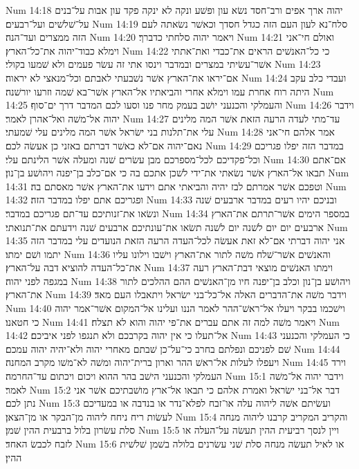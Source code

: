 Num 14:18  יהוה ארך אפים ורב־חסד נשׂא עון ופשׁע ונקה לא ינקה פקד עון אבות על־בנים על־שׁלשׁים ועל־רבעים׃
Num 14:19  סלח־נא לעון העם הזה כגדל חסדך וכאשׁר נשׂאתה לעם הזה ממצרים ועד־הנה׃
Num 14:20  ויאמר יהוה סלחתי כדברך׃
Num 14:21  ואולם חי־אני וימלא כבוד־יהוה את־כל־הארץ׃
Num 14:22  כי כל־האנשׁים הראים את־כבדי ואת־אתתי אשׁר־עשׂיתי במצרים ובמדבר וינסו אתי זה עשׂר פעמים ולא שׁמעו בקולי׃
Num 14:23  אם־יראו את־הארץ אשׁר נשׁבעתי לאבתם וכל־מנאצי לא יראוה׃
Num 14:24  ועבדי כלב עקב היתה רוח אחרת עמו וימלא אחרי והביאתיו אל־הארץ אשׁר־בא שׁמה וזרעו יורשׁנה׃
Num 14:25  והעמלקי והכנעני יושׁב בעמק מחר פנו וסעו לכם המדבר דרך ים־סוף׃
Num 14:26  וידבר יהוה אל־משׁה ואל־אהרן לאמר׃
Num 14:27  עד־מתי לעדה הרעה הזאת אשׁר המה מלינים עלי את־תלנות בני ישׂראל אשׁר המה מלינים עלי שׁמעתי׃
Num 14:28  אמר אלהם חי־אני נאם־יהוה אם־לא כאשׁר דברתם באזני כן אעשׂה לכם׃
Num 14:29  במדבר הזה יפלו פגריכם וכל־פקדיכם לכל־מספרכם מבן עשׂרים שׁנה ומעלה אשׁר הלינתם עלי׃
Num 14:30  אם־אתם תבאו אל־הארץ אשׁר נשׂאתי את־ידי לשׁכן אתכם בה כי אם־כלב בן־יפנה ויהושׁע בן־נון׃
Num 14:31  וטפכם אשׁר אמרתם לבז יהיה והביאתי אתם וידעו את־הארץ אשׁר מאסתם בה׃
Num 14:32  ופגריכם אתם יפלו במדבר הזה׃
Num 14:33  ובניכם יהיו רעים במדבר ארבעים שׁנה ונשׂאו את־זנותיכם עד־תם פגריכם במדבר׃
Num 14:34  במספר הימים אשׁר־תרתם את־הארץ ארבעים יום יום לשׁנה יום לשׁנה תשׂאו את־עונתיכם ארבעים שׁנה וידעתם את־תנואתי׃
Num 14:35  אני יהוה דברתי אם־לא זאת אעשׂה לכל־העדה הרעה הזאת הנועדים עלי במדבר הזה יתמו ושׁם ימתו׃
Num 14:36  והאנשׁים אשׁר־שׁלח משׁה לתור את־הארץ וישׁבו וילונו עליו את־כל־העדה להוציא דבה על־הארץ׃
Num 14:37  וימתו האנשׁים מוצאי דבת־הארץ רעה במגפה לפני יהוה׃
Num 14:38  ויהושׁע בן־נון וכלב בן־יפנה חיו מן־האנשׁים ההם ההלכים לתור את־הארץ׃
Num 14:39  וידבר משׁה את־הדברים האלה אל־כל־בני ישׂראל ויתאבלו העם מאד׃
Num 14:40  וישׁכמו בבקר ויעלו אל־ראשׁ־ההר לאמר הננו ועלינו אל־המקום אשׁר־אמר יהוה כי חטאנו׃
Num 14:41  ויאמר משׁה למה זה אתם עברים את־פי יהוה והוא לא תצלח׃
Num 14:42  אל־תעלו כי אין יהוה בקרבכם ולא תנגפו לפני איביכם׃
Num 14:43  כי העמלקי והכנעני שׁם לפניכם ונפלתם בחרב כי־על־כן שׁבתם מאחרי יהוה ולא־יהיה יהוה עמכם׃
Num 14:44  ויעפלו לעלות אל־ראשׁ ההר וארון ברית־יהוה ומשׁה לא־משׁו מקרב המחנה׃
Num 14:45  וירד העמלקי והכנעני הישׁב בהר ההוא ויכום ויכתום עד־החרמה׃
Num 15:1  וידבר יהוה אל־משׁה לאמר׃
Num 15:2  דבר אל־בני ישׂראל ואמרת אלהם כי תבאו אל־ארץ מושׁבתיכם אשׁר אני נתן לכם׃
Num 15:3  ועשׂיתם אשׁה ליהוה עלה או־זבח לפלא־נדר או בנדבה או במעדיכם לעשׂות ריח ניחח ליהוה מן־הבקר או מן־הצאן׃
Num 15:4  והקריב המקריב קרבנו ליהוה מנחה סלת עשׂרון בלול ברבעית ההין שׁמן׃
Num 15:5  ויין לנסך רביעית ההין תעשׂה על־העלה או לזבח לכבשׂ האחד׃
Num 15:6  או לאיל תעשׂה מנחה סלת שׁני עשׂרנים בלולה בשׁמן שׁלשׁית ההין׃
